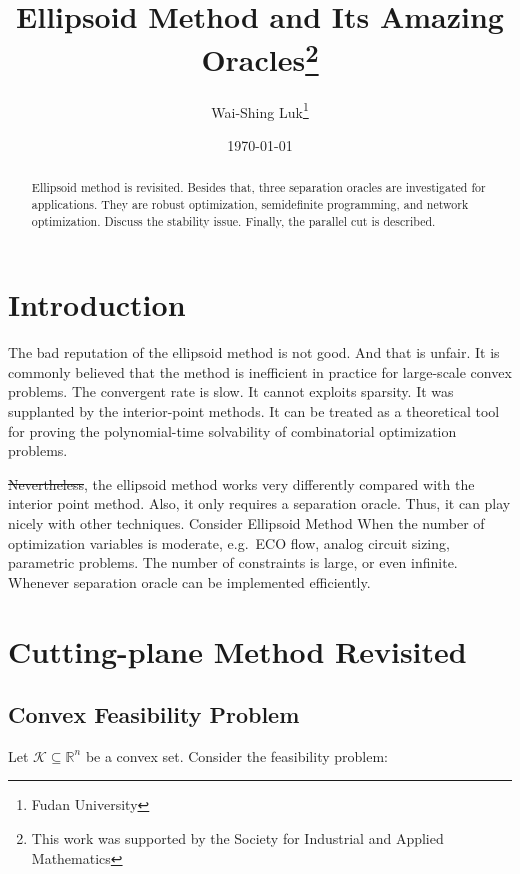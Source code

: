 \documentclass[final,leqno]{siamltex}
\title{Ellipsoid Method and Its Amazing Oracles\thanks{This work was supported by the Society for Industrial and Applied Mathematics}}
\author{Wai-Shing Luk\thanks{Fudan University}}
\date{\today}
\providecommand{\DIFaddtex}[1]{{\protect\color{blue}\uwave{#1}}} %
\providecommand{\DIFdeltex}[1]{{\protect\color{red}\sout{#1}}}                      %
\providecommand{\DIFaddbegin}{} %
\providecommand{\DIFaddend}{} %
\providecommand{\DIFdelbegin}{} %
\providecommand{\DIFdelend}{} %
\providecommand{\DIFadd}[1]{\texorpdfstring{\DIFaddtex{#1}}{#1}} %
\providecommand{\DIFdel}[1]{\texorpdfstring{\DIFdeltex{#1}}{}} %
\newcommand{\DIFscaledelfig}{0.5}
\newlength{\DIFdelgraphicswidth} %
\newlength{\DIFdelgraphicsheight} %
\newcommand{\DIFaddincludegraphics}[2][]{{\color{blue}\fbox{\DIFOincludegraphics[#1]{#2}}}} %
\newcommand{\DIFdelincludegraphics}[2][]{%
\sbox{\DIFdelgraphicsbox}{\DIFOincludegraphics[#1]{#2}}%
\settoboxwidth{\DIFdelgraphicswidth}{\DIFdelgraphicsbox} %
\settoboxtotalheight{\DIFdelgraphicsheight}{\DIFdelgraphicsbox} %
\scalebox{\DIFscaledelfig}{%
\parbox[b]{\DIFdelgraphicswidth}{\usebox{\DIFdelgraphicsbox}\\[-\baselineskip] \rule{\DIFdelgraphicswidth}{0em}}\llap{\resizebox{\DIFdelgraphicswidth}{\DIFdelgraphicsheight}{%
\setlength{\unitlength}{\DIFdelgraphicswidth}%
\begin{picture}(1,1)%
\thicklines\linethickness{2pt} %
{\color[rgb]{1,0,0}\put(0,0){\framebox(1,1){}}}%
{\color[rgb]{1,0,0}\put(0,0){\line( 1,1){1}}}%
{\color[rgb]{1,0,0}\put(0,1){\line(1,-1){1}}}%
\end{picture}%
}\hspace*{3pt}}} %
} %
\DeclareRobustCommand{\DIFaddbegin}{\DIFOaddbegin \let\includegraphics\DIFaddincludegraphics} %
\DeclareRobustCommand{\DIFaddend}{\DIFOaddend \let\includegraphics\DIFOincludegraphics} %
\DeclareRobustCommand{\DIFdelbegin}{\DIFOdelbegin \let\includegraphics\DIFdelincludegraphics} %
\DeclareRobustCommand{\DIFdelend}{\DIFOaddend \let\includegraphics\DIFOincludegraphics} %
\begin{document}
\maketitle
\begin{abstract}
Ellipsoid method is revisited. Besides that, three separation oracles are investigated for applications. They are robust optimization, semidefinite programming, and network optimization. Discuss the stability issue. Finally, the parallel cut is described.
\end{abstract}

\hypertarget{sec:introduction}{%
\section{Introduction}\label{sec:introduction}}

The bad reputation of the ellipsoid method is not good. And that is unfair. It is commonly believed that the method is inefficient in practice for large-scale convex problems. The convergent rate is slow. It cannot exploits sparsity. It was supplanted by the interior-point methods. It can be treated as a theoretical tool for proving the polynomial-time solvability of combinatorial optimization problems.

\DIFdelbegin \DIFdel{Nevertheless}\DIFdelend \DIFaddbegin \DIFadd{However}\DIFaddend , the ellipsoid method works very differently compared with the interior point method. Also, it only requires a separation oracle. Thus, it can play nicely with other techniques. Consider Ellipsoid Method When the number of optimization variables is moderate, e.g.~ECO flow, analog circuit sizing, parametric problems. The number of constraints is large, or even infinite. Whenever separation oracle can be implemented efficiently.

\hypertarget{sec:cutting-plane-method-revisited}{%
\section{Cutting-plane Method Revisited}\label{sec:cutting-plane-method-revisited}}

\hypertarget{sec:convex-feasibility-problem}{%
\subsection{Convex Feasibility Problem}\label{sec:convex-feasibility-problem}}

Let \(\mathcal{K} \subseteq \mathbb{R}^n\) be a convex set. Consider the feasibility problem:
\end{document}
